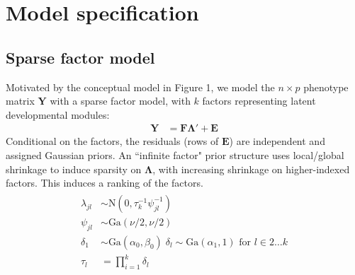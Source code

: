 \documentclass[11pt]{amsart}
\begin{document}
\section{Model specification}
\subsection{Sparse factor model}
Motivated by the conceptual model in Figure 1, we model the $n \times p$ phenotype matrix $\mathbf{Y}$ with a sparse factor model, with $k$ factors representing latent developmental modules:
\begin{align}
\mathbf{Y} &= \mathbf{F}\mathbf{\Lambda}' + \mathbf{E}
\end{align}
Conditional on the factors, the residuals (rows of $\mathbf{E}$) are independent and assigned Gaussian priors.
An ``infinite factor"\citep{Bhattacharya:2011gh} prior structure uses local/global shrinkage to induce sparsity on $\mathbf{\Lambda}$, with increasing shrinkage on higher-indexed factors. This induces a ranking of the factors.
\begin{align}\begin{split}
\lambda_{jl} &\sim \mbox{N}(0,\tau^{-1}_k \psi^{-1}_{jl}) \\
\psi_{jl} &\sim \mbox{Ga}(\nu/2,\nu/2) \\
\delta_1 &\sim \mbox{Ga}(\alpha_0,\beta_0)\; \delta_l \sim \mbox{Ga}(\alpha_1,1) \mbox{ for } l \in {2\dots k} \\
\tau_l &= \prod_{i=1}^k \delta_l
\end{split}\end{align}
\end{document}
